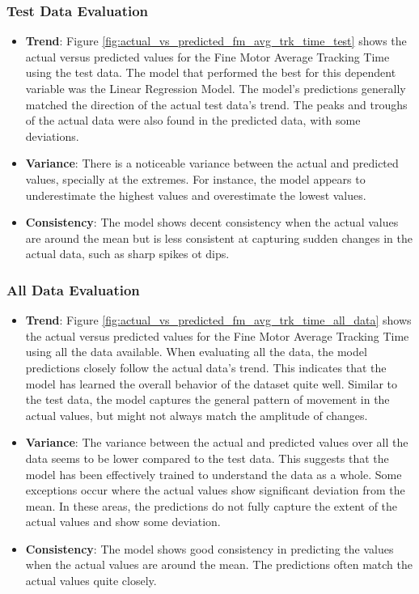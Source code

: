 \subsubsection*{Test Data Evaluation}

\begin{itemize}
    \item \textbf{Trend}: Figure \ref{fig:actual_vs_predicted_fm_avg_trk_time_test} shows the actual versus predicted values for the Fine Motor Average Tracking Time using the test data. The model that performed 
    the best for this dependent variable was the Linear Regression Model. The model's predictions generally matched the direction of the actual test data's trend. The peaks and troughs of the
    actual data were also found in the predicted data, with some deviations. 
    \item \textbf{Variance}: There is a noticeable variance between the actual and predicted values, specially at the extremes. For instance, the model appears to underestimate the highest values
    and overestimate the lowest values.
    \item \textbf{Consistency}: The model shows decent consistency when the actual values are around the mean but is less consistent at capturing sudden changes in the actual data, such as sharp spikes ot dips.
\end{itemize}

\subsubsection*{All Data Evaluation}

\begin{itemize}
    \item \textbf{Trend}: Figure \ref{fig:actual_vs_predicted_fm_avg_trk_time_all_data} shows the actual versus predicted values for the Fine Motor Average Tracking Time using all the data
    available. When evaluating all the data, the model predictions closely follow the actual data's trend. This indicates that the model has learned the overall behavior of the dataset quite well.
    Similar to the test data, the model captures the general pattern of movement in the actual values, but might not always match the amplitude of changes.
    \item \textbf{Variance}: The variance between the actual and predicted values over all the data seems to be lower compared to the test data. This suggests that the model has been 
    effectively trained to understand the data as a whole. Some exceptions occur where the actual values show significant deviation from the mean. In these areas, the predictions do not fully 
    capture the extent of the actual values and show some deviation.
    \item \textbf{Consistency}: The model shows good consistency in predicting the values when the actual values are around the mean. The predictions often match the actual values quite closely.
\end{itemize}

